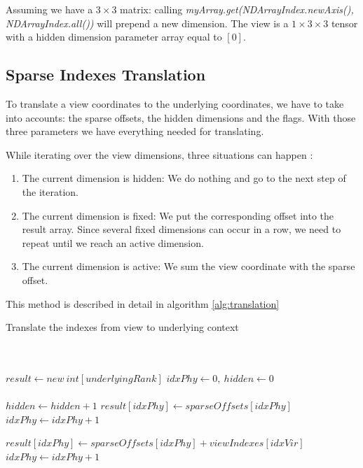 Assuming we have a $3\times 3$ matrix: calling \textit{myArray.get(NDArrayIndex.newAxis(), NDArrayIndex.all())} will prepend a new dimension. The view is a $1\times 3\times 3$ tensor with a hidden dimension parameter array equal to $[0]$.

\subsection{Sparse Indexes Translation}
\label{ssec:translation}

To translate a view coordinates to the underlying coordinates, we have to take into accounts: the sparse offsets, the hidden dimensions and the flags. With those three parameters we have everything needed for translating.

While iterating over the view dimensions, three situations can happen :
\begin{enumerate}
	\item The current dimension is hidden: We do nothing and go to the next step of the iteration.
	\item The current dimension is fixed: We put the corresponding offset into the result array. Since several fixed dimensions can occur in a row, we need to repeat until we reach an active dimension.
	\item The current dimension is active: We sum the view coordinate with the sparse offset.
\end{enumerate}
This method is described in detail in algorithm \ref{alg:translation} 


\begin{algorithm}
	\caption{Translate the indexes from view to underlying context}
	\label{alg:translation}
	\begin{algorithmic}
		
		\\
		\\
		\State $result \gets new\ int[underlyingRank]$
		\State $idxPhy \gets 0,\ hidden \gets 0 $
		\\
		\\
		
		\State $hidden \gets hidden + 1$
		\Else
		\State $result[idxPhy] \gets sparseOffsets[idxPhy]$ 
		\State $idxPhy \gets idxPhy + 1$
		\EndWhile\\
		
		\State $result[idxPhy] \gets sparseOffsets[idxPhy] + viewIndexes[idxVir]$ 
		\State $idxPhy \gets idxPhy + 1$
		\EndIf
		
		\EndIf
		
		\EndFor		
		\EndProcedure
	\end{algorithmic}
\end{algorithm}
